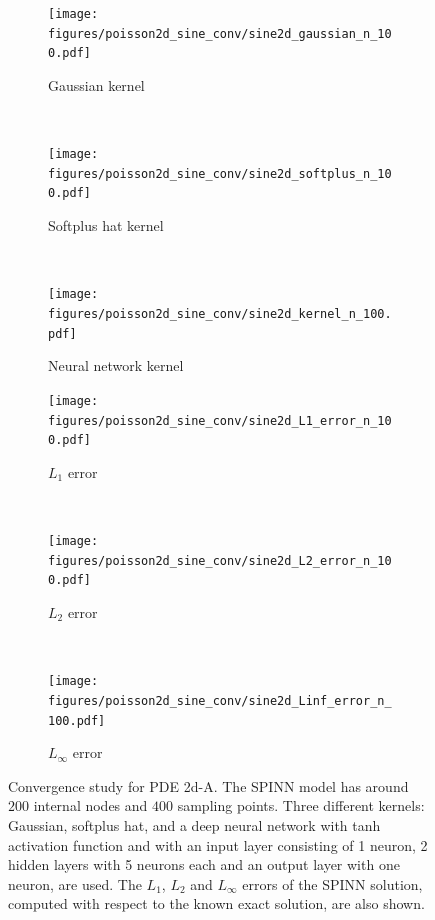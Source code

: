 \documentclass[12pt]{article}
\begin{document}
\begin{figure}
\begin{subfigure}{0.32\textwidth}
\centering
\texttt{[image: figures/poisson2d\_sine\_conv/sine2d\_gaussian\_n\_100.pdf]}
\caption{Gaussian kernel}
\label{fig:2d_A_gaussian_n_100}
\end{subfigure}
~
\begin{subfigure}{0.32\textwidth}
\centering
\texttt{[image: figures/poisson2d\_sine\_conv/sine2d\_softplus\_n\_100.pdf]}
\caption{Softplus hat kernel}
\label{fig:2d_A_softplus_n_100_a}    
\end{subfigure}
~
\begin{subfigure}{0.32\textwidth}
\centering
\texttt{[image: figures/poisson2d\_sine\_conv/sine2d\_kernel\_n\_100.pdf]}
\caption{Neural network kernel}
\label{fig:2d_A_kernel_n_100}    
\end{subfigure}
\begin{subfigure}{0.32\textwidth}
\centering
\texttt{[image: figures/poisson2d\_sine\_conv/sine2d\_L1\_error\_n\_100.pdf]}
\caption{$L_1$ error}
\label{fig:2d_A_L1_n_100}  
\end{subfigure}
~
\begin{subfigure}{0.32\textwidth}
\centering
\texttt{[image: figures/poisson2d\_sine\_conv/sine2d\_L2\_error\_n\_100.pdf]}
\caption{$L_2$ error}
\label{fig:2d_A_L2_n_100}      
\end{subfigure}
~
\begin{subfigure}{0.32\textwidth}
\centering
\texttt{[image: figures/poisson2d\_sine\_conv/sine2d\_Linf\_error\_n\_100.pdf]}
\caption{$L_{\infty}$ error}
\label{fig:2d_A_Linf_n_100_a}      
\end{subfigure}
\caption{Convergence study for PDE 2d-A. The SPINN model has around $200$ internal nodes and $400$ sampling points. Three different kernels: Gaussian, softplus hat, and a deep neural network with tanh activation function and with an input layer consisting of 1 neuron, 2 hidden layers with 5 neurons each and an output layer with one neuron, are used. The $L_1$, $L_2$ and $L_{\infty}$ errors of the SPINN solution, computed with respect to the known exact solution, are also shown.}
\label{fig:sine2d_conv_activation}
\end{figure}
\end{document}
